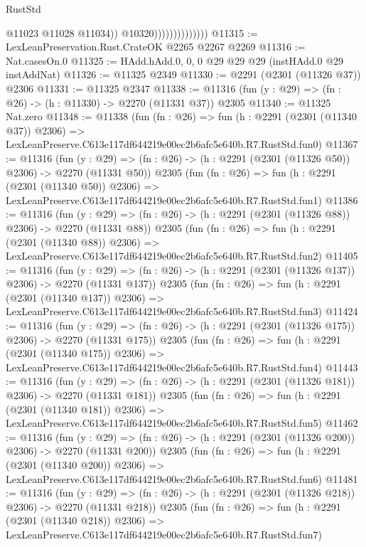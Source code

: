 \begin{lexlean}{RustStd}
\begin{coremodule}
                                    @11023
                                    @11028
                                    @11034))
                                @10320))))))))))))))
@11315 := LexLeanPreservation.Rust.CrateOK @2265 @2267 @2269
@11316 := Nat.casesOn.{0}
@11325 := HAdd.hAdd.{0, 0, 0} @29 @29 @29 (instHAdd.{0} @29 instAddNat)
@11326 := @11325 @2349
@11330 := @2291 (@2301 (@11326 @37)) @2306
@11331 := @11325 @2347
@11338 := @11316 (fun (y : @29) => (fn : @26) -> (h : @11330) -> @2270 (@11331 @37)) @2305
@11340 := @11325 Nat.zero
@11348 := @11338
    (fun (fn : @26) =>
    fun (h : @2291 (@2301 (@11340 @37)) @2306) =>
    LexLeanPreserve.C613e117df644219e00ec2b6afc5e640b.R7.RustStd.fun0)
@11367 := @11316
    (fun (y : @29) => (fn : @26) -> (h : @2291 (@2301 (@11326 @50)) @2306) -> @2270 (@11331 @50))
    @2305
    (fun (fn : @26) =>
    fun (h : @2291 (@2301 (@11340 @50)) @2306) =>
    LexLeanPreserve.C613e117df644219e00ec2b6afc5e640b.R7.RustStd.fun1)
@11386 := @11316
    (fun (y : @29) => (fn : @26) -> (h : @2291 (@2301 (@11326 @88)) @2306) -> @2270 (@11331 @88))
    @2305
    (fun (fn : @26) =>
    fun (h : @2291 (@2301 (@11340 @88)) @2306) =>
    LexLeanPreserve.C613e117df644219e00ec2b6afc5e640b.R7.RustStd.fun2)
@11405 := @11316
    (fun (y : @29) => (fn : @26) -> (h : @2291 (@2301 (@11326 @137)) @2306) -> @2270 (@11331 @137))
    @2305
    (fun (fn : @26) =>
    fun (h : @2291 (@2301 (@11340 @137)) @2306) =>
    LexLeanPreserve.C613e117df644219e00ec2b6afc5e640b.R7.RustStd.fun3)
@11424 := @11316
    (fun (y : @29) => (fn : @26) -> (h : @2291 (@2301 (@11326 @175)) @2306) -> @2270 (@11331 @175))
    @2305
    (fun (fn : @26) =>
    fun (h : @2291 (@2301 (@11340 @175)) @2306) =>
    LexLeanPreserve.C613e117df644219e00ec2b6afc5e640b.R7.RustStd.fun4)
@11443 := @11316
    (fun (y : @29) => (fn : @26) -> (h : @2291 (@2301 (@11326 @181)) @2306) -> @2270 (@11331 @181))
    @2305
    (fun (fn : @26) =>
    fun (h : @2291 (@2301 (@11340 @181)) @2306) =>
    LexLeanPreserve.C613e117df644219e00ec2b6afc5e640b.R7.RustStd.fun5)
@11462 := @11316
    (fun (y : @29) => (fn : @26) -> (h : @2291 (@2301 (@11326 @200)) @2306) -> @2270 (@11331 @200))
    @2305
    (fun (fn : @26) =>
    fun (h : @2291 (@2301 (@11340 @200)) @2306) =>
    LexLeanPreserve.C613e117df644219e00ec2b6afc5e640b.R7.RustStd.fun6)
@11481 := @11316
    (fun (y : @29) => (fn : @26) -> (h : @2291 (@2301 (@11326 @218)) @2306) -> @2270 (@11331 @218))
    @2305
    (fun (fn : @26) =>
    fun (h : @2291 (@2301 (@11340 @218)) @2306) =>
    LexLeanPreserve.C613e117df644219e00ec2b6afc5e640b.R7.RustStd.fun7)

\end{coremodule}
\end{lexlean}
